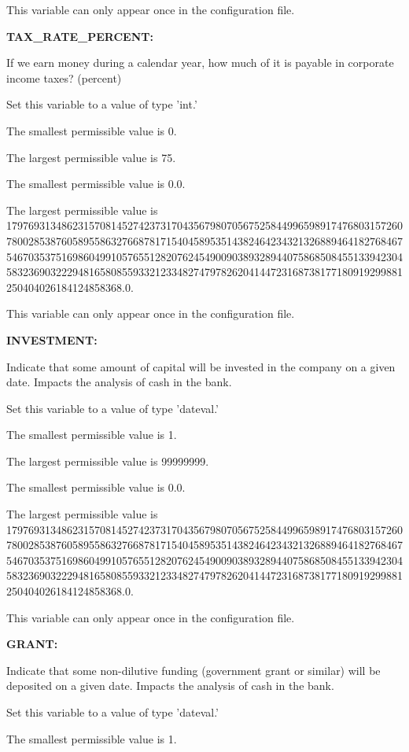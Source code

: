 This variable can only appear once in the configuration file.


\textbf{TAX\_RATE\_PERCENT:}


If we earn money during a calendar year, how much of it is payable in corporate income taxes? (percent)

Set this variable to a value of type 'int.'

The smallest permissible value is 0.

The largest permissible value is 75.

The smallest permissible value is 0.0.

The largest permissible value is 179769313486231570814527423731704356798070567525844996598917476803157260780028538760589558632766878171540458953514382464234321326889464182768467546703537516986049910576551282076245490090389328944075868508455133942304583236903222948165808559332123348274797826204144723168738177180919299881250404026184124858368.0.

This variable can only appear once in the configuration file.


\textbf{INVESTMENT:}


Indicate that some amount of capital will be invested in the company on a given date.  Impacts the analysis of cash in the bank.

Set this variable to a value of type 'dateval.'

The smallest permissible value is 1.

The largest permissible value is 99999999.

The smallest permissible value is 0.0.

The largest permissible value is 179769313486231570814527423731704356798070567525844996598917476803157260780028538760589558632766878171540458953514382464234321326889464182768467546703537516986049910576551282076245490090389328944075868508455133942304583236903222948165808559332123348274797826204144723168738177180919299881250404026184124858368.0.

This variable can only appear once in the configuration file.


\textbf{GRANT:}


Indicate that some non-dilutive funding (government grant or similar) will be deposited on a given date.  Impacts the analysis of cash in the bank.

Set this variable to a value of type 'dateval.'

The smallest permissible value is 1.

